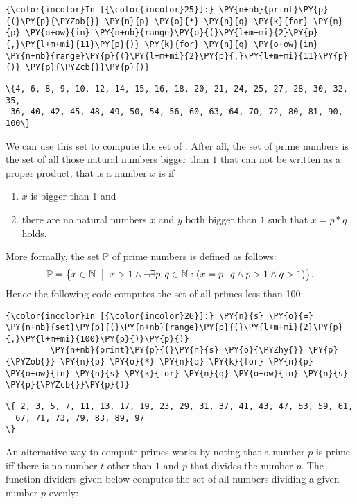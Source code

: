 \begin{Verbatim}[commandchars=\\\{\}]
{\color{incolor}In [{\color{incolor}25}]:} \PY{n+nb}{print}\PY{p}{(}\PY{p}{\PYZob{}} \PY{n}{p} \PY{o}{*} \PY{n}{q} \PY{k}{for} \PY{n}{p} \PY{o+ow}{in} \PY{n+nb}{range}\PY{p}{(}\PY{l+m+mi}{2}\PY{p}{,}\PY{l+m+mi}{11}\PY{p}{)} \PY{k}{for} \PY{n}{q} \PY{o+ow}{in} \PY{n+nb}{range}\PY{p}{(}\PY{l+m+mi}{2}\PY{p}{,}\PY{l+m+mi}{11}\PY{p}{)} \PY{p}{\PYZcb{}}\PY{p}{)}
\end{Verbatim}

\begin{Verbatim}[commandchars=\\\{\}]
\{4, 6, 8, 9, 10, 12, 14, 15, 16, 18, 20, 21, 24, 25, 27, 28, 30, 32, 35,
 36, 40, 42, 45, 48, 49, 50, 54, 56, 60, 63, 64, 70, 72, 80, 81, 90, 100\}
\end{Verbatim}
We can use this set to compute the set of . After
all, the set of prime numbers is the set of all those natural numbers
bigger than \(1\) that can not be written as a proper product, that is a
number \(x\) is  if

\begin{enumerate}
\item $x$ is bigger than $1$ and 
\item there are no natural numbers $x$ and $y$ both bigger than $1$ such that $x = p * q$ holds.
\end{enumerate}
More formally, the set \(\mathbb{P}\) of prime numbers is defined as
follows:
\[ \mathbb{P} = \bigl\{ x \in \mathbb{N} \;\bigm|\; x > 1 \wedge \neg \exists p, q \in \mathbb{N}: (x = p \cdot q \wedge p > 1 \wedge q > 1)\bigr\}. \]
Hence the following code computes the set of all primes less than 100:

\begin{Verbatim}[commandchars=\\\{\}]
{\color{incolor}In [{\color{incolor}26}]:} \PY{n}{s} \PY{o}{=} \PY{n+nb}{set}\PY{p}{(}\PY{n+nb}{range}\PY{p}{(}\PY{l+m+mi}{2}\PY{p}{,}\PY{l+m+mi}{100}\PY{p}{)}\PY{p}{)}
         \PY{n+nb}{print}\PY{p}{(}\PY{n}{s} \PY{o}{\PYZhy{}} \PY{p}{\PYZob{}} \PY{n}{p} \PY{o}{*} \PY{n}{q} \PY{k}{for} \PY{n}{p} \PY{o+ow}{in} \PY{n}{s} \PY{k}{for} \PY{n}{q} \PY{o+ow}{in} \PY{n}{s} \PY{p}{\PYZcb{}}\PY{p}{)}
\end{Verbatim}


\begin{Verbatim}[commandchars=\\\{\}]
\{ 2, 3, 5, 7, 11, 13, 17, 19, 23, 29, 31, 37, 41, 43, 47, 53, 59, 61,
  67, 71, 73, 79, 83, 89, 97
\}
\end{Verbatim}
An alternative way to compute primes works by noting that a number \(p\)
is prime iff there is no number \(t\) other than \(1\) and \(p\) that
divides the number \(p\). The function dividers given below computes the
set of all numbers dividing a given number \(p\) evenly:

